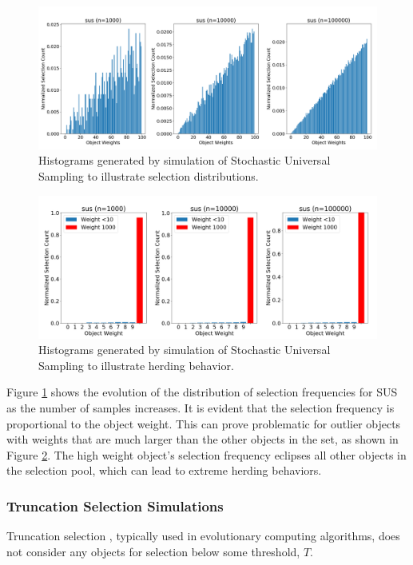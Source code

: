\documentclass[12pt]{article}
\begin{document}
    \begin{figure}[htbp]
      \centering
      \includegraphics[scale=0.32]{images/herding_roullette.png} 
      \caption{Histograms generated by simulation of Stochastic Universal
               Sampling to illustrate selection distributions.}
      \label{fig:herding_roullette}
    \end{figure}

    \begin{figure}[htbp]
      \centering
      \includegraphics[scale=0.32]{images/pathological_roullette.png} 
      \caption{Histograms generated by simulation of Stochastic Universal
               Sampling to illustrate herding behavior.}
      \label{fig:pathological_roullette}
    \end{figure}

    Figure \ref{fig:herding_roullette} shows the evolution of the
    distribution of selection frequencies for SUS as the number of samples
    increases. It is evident that the selection frequency is proportional to the
    object weight. This can prove problematic for outlier objects with weights
    that are much larger than the other objects in the set, as shown in Figure
    \ref{fig:pathological_roullette}. The high weight object's selection
    frequency eclipses all other objects in the selection pool, which can lead
    to extreme herding behaviors.

    \subsubsection{Truncation Selection Simulations}
    Truncation selection \cite{truncation1973}, typically used in evolutionary
    computing algorithms, does not consider any objects for selection below
    some threshold, $T$. 
\end{document}
